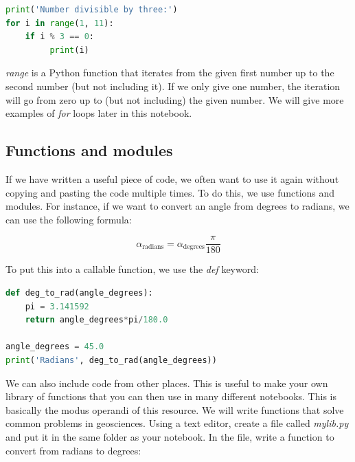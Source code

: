 \documentclass[a4paper , 12pt]{book}
\begin{document}
\begin{center}
\begin {lstlisting}[language=Python, frame=single]
print('Number divisible by three:')
for i in range(1, 11):
    if i %
         print(i)
\end{lstlisting}
\end{center}

\textit{range} is a Python function that iterates from the given first number up to the second number (but not including it). If we only give one number, the iteration will go from zero up to (but not including) the given number. We will give more examples of \textit{for} loops later in this notebook.

\subsection{Functions and modules}

If we have written a useful piece of code, we often want to use it again without copying and pasting the code multiple times. To do this, we use functions and modules. For instance, if we want to convert an angle from degrees to radians, we can use the following formula: 

\begin{equation}
    \alpha_\text{radians} = \alpha_\text{degrees}\frac{\pi}{180}
\end{equation}    

To put this into a callable function, we use the \textit{def} keyword:

\begin{center}
\begin {lstlisting}[language=Python, frame=single]
def deg_to_rad(angle_degrees):
    pi = 3.141592
    return angle_degrees*pi/180.0

angle_degrees = 45.0
print('Radians', deg_to_rad(angle_degrees))
\end{lstlisting}
\end{center}

We can also include code from other places. This is useful to make your own library of functions that you can then use in many different notebooks. This is basically the modus operandi of this resource. We will write functions that solve common problems in geosciences. Using a text editor, create a file called \textit{mylib.py} and put it in the same folder as your notebook. In the file, write a function to convert from radians to degrees:
\end{document}
